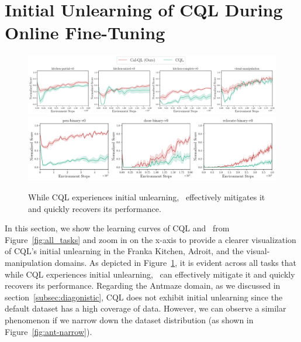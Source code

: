 \section{Initial Unlearning of CQL During Online Fine-Tuning}
\label{app:cql_dip_zoom_in}
\vspace{-0.2cm}
\begin{figure}[h]
\vspace{-0.5cm}
\begin{center}    
{\includegraphics[clip,width=1.0\linewidth]{chapters/cal_ql/figs-sample/kitchen-cog-zoom-in.pdf}} {\includegraphics[clip,width=0.75\linewidth]{chapters/cal_ql/figs-sample/adroit-zoom-in.pdf}}
\end{center}
\vspace{-0.35cm}
\caption{\label{fig:dip_zoom} \footnotesize{While CQL experiences initial unlearning, \methodname\ effectively mitigates it and quickly recovers its performance.}}
\vspace{-0.4cm}
\end{figure}
In this section, we show the learning curves of CQL and \methodname\ from Figure~\ref{fig:all_tasks} and zoom in on the x-axis to provide a clearer visualization of CQL's initial unlearning in the Franka Kitchen, Adroit, and the visual-manipulation domains. As depicted in Figure~\ref{fig:dip_zoom}, it is evident across all tasks that while CQL experiences initial unlearning, \methodname\ can effectively mitigate it and quickly recovers its performance. Regarding the Antmaze domain, as we discussed in section~\ref{subsec:diagonistic}, CQL does not exhibit initial unlearning since the default dataset has a high coverage of data. However, we can observe a similar phenomenon if we narrow down the dataset distribution (as shown in Figure~\ref{fig:ant-narrow}).




\iffalse

